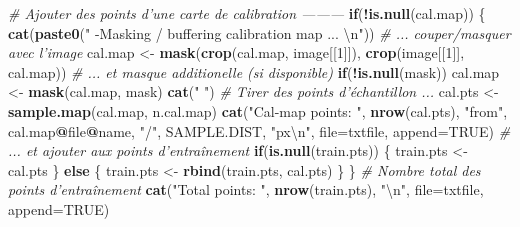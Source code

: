 \documentclass[a4paper, notitlepage, 12pt, krantz2]{krantz}
\newenvironment{Shaded}{\begin{snugshade}}{\end{snugshade}}
\newcommand{\CharTok}[1]{\textcolor[rgb]{0.31,0.60,0.02}{#1}}
\newcommand{\CommentTok}[1]{\textcolor[rgb]{0.56,0.35,0.01}{\textit{#1}}}
\newcommand{\ControlFlowTok}[1]{\textcolor[rgb]{0.13,0.29,0.53}{\textbf{#1}}}
\newcommand{\DataTypeTok}[1]{\textcolor[rgb]{0.13,0.29,0.53}{#1}}
\newcommand{\DecValTok}[1]{\textcolor[rgb]{0.00,0.00,0.81}{#1}}
\newcommand{\KeywordTok}[1]{\textcolor[rgb]{0.13,0.29,0.53}{\textbf{#1}}}
\newcommand{\NormalTok}[1]{#1}
\newcommand{\OperatorTok}[1]{\textcolor[rgb]{0.81,0.36,0.00}{\textbf{#1}}}
\newcommand{\OtherTok}[1]{\textcolor[rgb]{0.56,0.35,0.01}{#1}}
\newcommand{\StringTok}[1]{\textcolor[rgb]{0.31,0.60,0.02}{#1}}
\begin{document}
\begin{Shaded}
\begin{Highlighting}[]
  \CommentTok{# Ajouter des points d'une carte de calibration ---------}
  \ControlFlowTok{if}\NormalTok{(}\OperatorTok{!}\KeywordTok{is.null}\NormalTok{(cal.map)) \{}
    \KeywordTok{cat}\NormalTok{(}\KeywordTok{paste0}\NormalTok{(}\StringTok{"    -Masking / buffering calibration map ... }\CharTok{\textbackslash{}n}\StringTok{"}\NormalTok{))}
    \CommentTok{# ... couper/masquer avec l'image}
\NormalTok{    cal.map  <-}\StringTok{ }\KeywordTok{mask}\NormalTok{(}\KeywordTok{crop}\NormalTok{(cal.map, image[[}\DecValTok{1}\NormalTok{]]), }\KeywordTok{crop}\NormalTok{(image[[}\DecValTok{1}\NormalTok{]], cal.map)) }
    \CommentTok{# ... et masque additionelle (si disponible)}
    \ControlFlowTok{if}\NormalTok{(}\OperatorTok{!}\KeywordTok{is.null}\NormalTok{(mask)) cal.map <-}\StringTok{ }\KeywordTok{mask}\NormalTok{(cal.map, mask)                     }
    \KeywordTok{cat}\NormalTok{(}\StringTok{"    "}\NormalTok{)}
    \CommentTok{# Tirer des points d'échantillon ...}
\NormalTok{    cal.pts <-}\StringTok{ }\KeywordTok{sample.map}\NormalTok{(cal.map, n.cal.map)}
    \KeywordTok{cat}\NormalTok{(}\StringTok{"Cal-map points: "}\NormalTok{, }\KeywordTok{nrow}\NormalTok{(cal.pts), }\StringTok{"from"}\NormalTok{, cal.map}\OperatorTok{@}\NormalTok{file}\OperatorTok{@}\NormalTok{name, }\StringTok{"/"}\NormalTok{, }
\NormalTok{        SAMPLE.DIST, }\StringTok{"px}\CharTok{\textbackslash{}n}\StringTok{"}\NormalTok{, }\DataTypeTok{file=}\NormalTok{txtfile, }\DataTypeTok{append=}\OtherTok{TRUE}\NormalTok{)}
    \CommentTok{# ... et ajouter aux points d'entraînement}
    \ControlFlowTok{if}\NormalTok{(}\KeywordTok{is.null}\NormalTok{(train.pts)) \{}
\NormalTok{      train.pts <-}\StringTok{ }\NormalTok{cal.pts                                      }
\NormalTok{    \} }\ControlFlowTok{else}\NormalTok{ \{}
\NormalTok{      train.pts <-}\StringTok{ }\KeywordTok{rbind}\NormalTok{(train.pts, cal.pts)}
\NormalTok{    \}}
\NormalTok{  \}}
  \CommentTok{# Nombre total des points d'entraînement}
  \KeywordTok{cat}\NormalTok{(}\StringTok{"Total points:   "}\NormalTok{, }\KeywordTok{nrow}\NormalTok{(train.pts), }\StringTok{"}\CharTok{\textbackslash{}n}\StringTok{"}\NormalTok{, }\DataTypeTok{file=}\NormalTok{txtfile, }\DataTypeTok{append=}\OtherTok{TRUE}\NormalTok{)}
  

\end{Highlighting}
\end{Shaded}
\end{document}
